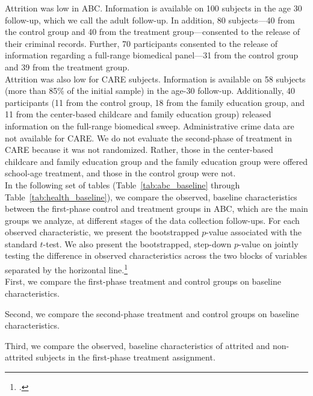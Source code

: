\noindent Attrition was low in ABC. Information is available on 100 subjects in the age 30 follow-up, which we call the adult follow-up. In addition, 80 subjects---40 from the control group and 40 from the treatment group---consented to the release of their criminal records. Further, 70 participants consented to the release of information regarding a full-range biomedical panel---31 from the control group and 39 from the treatment group. \\

\noindent Attrition was also low for CARE subjects. Information is available on 58 subjects (more than 85\% of the initial sample) in the age-30 follow-up. Additionally, 40 participants (11 from the control group, 18 from the family education group, and 11 from the center-based childcare and family education group) released information on the full-range biomedical sweep. Administrative crime data are not available for CARE. We do not evaluate the second-phase of treatment in CARE because it was not randomized.  Rather, those in the center-based childcare and family education group and the family education group were offered school-age treatment, and those in the control group were not. \\

\noindent In the following set of tables (Table~\ref{tab:abc_baseline} through Table~\ref{tab:health_baseline}), we compare the observed, baseline characteristics between the first-phase control and treatment groups in ABC, which are the main groups we analyze, at different stages of the data collection follow-ups. For each observed characteristic, we present the bootstrapped $p$-value associated with the standard $t$-test. We also present the bootstrapped, step-down $p$-value on jointly testing the difference in observed characteristics across the two blocks of variables separated by the horizontal line.\footnote{\citet{Lehmann_Romano_2005_testing}.}\\

\noindent First, we compare the first-phase treatment and control groups on baseline characteristics.



\noindent Second, we compare the second-phase treatment and control groups on baseline characteristics.



\noindent Third, we compare the observed, baseline characteristics of attrited and non-attrited subjects in the first-phase treatment assignment.

